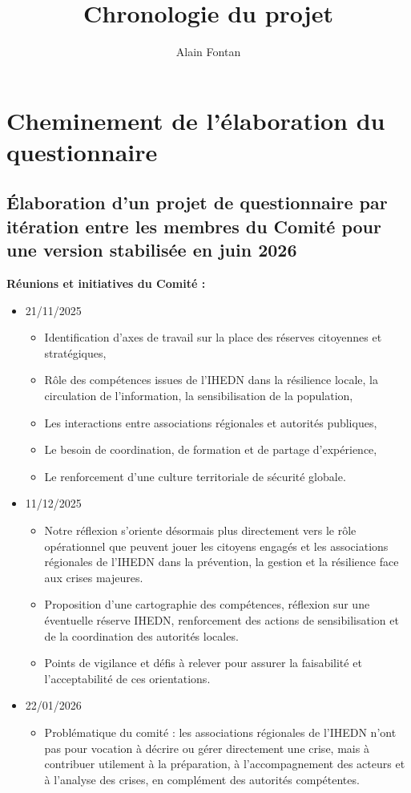 \documentclass[10pt,a4paper]{article}
\author{Alain Fontan}
\title{Chronologie du projet}
\begin{document}
\section{Cheminement de l'élaboration du questionnaire}

\subsection{Élaboration d'un projet de questionnaire par itération entre les membres du Comité pour une version stabilisée en juin 2026}

\textbf{Réunions et initiatives du Comité :}

\begin{itemize}
\item 21/11/2025
\begin{itemize}
\item Identification d'axes de travail sur la place des réserves citoyennes et stratégiques,
\item Rôle des compétences issues de l'IHEDN dans la résilience locale, la circulation de l'information, la sensibilisation de la population,
\item Les interactions entre associations régionales et autorités publiques,
\item Le besoin de coordination, de formation et de partage d'expérience,
\item Le renforcement d'une culture territoriale de sécurité globale.
\end{itemize}
\item 11/12/2025
\begin{itemize}
\item Notre réflexion s'oriente désormais plus directement vers le rôle opérationnel que peuvent jouer les citoyens engagés et les associations régionales de l'IHEDN dans la prévention, la gestion et la résilience face aux crises majeures.
\item Proposition d'une cartographie des compétences, réflexion sur une éventuelle réserve IHEDN, renforcement des actions de sensibilisation et de la coordination des autorités locales.
\item Points de vigilance et défis à relever pour assurer la faisabilité et l'acceptabilité de ces orientations.
\end{itemize}
\item 22/01/2026
\begin{itemize}
\item Problématique du comité :  les associations régionales de l'IHEDN n'ont pas pour vocation à décrire ou gérer directement une crise, mais à contribuer utilement à la préparation, à l'accompagnement des acteurs et à l'analyse des crises, en complément des autorités compétentes.

\end{itemize}
\end{itemize}
\end{document}
